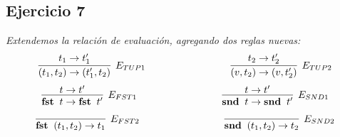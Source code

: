 \documentclass[a4paper,10pt]{article}
\begin{document}
\pagebreak
\subsection*{Ejercicio 7} 
	\emph{Extendemos la relación de evaluación, agregando dos reglas nuevas:}
	\\
	\begin{align*}
		\infer[E_{TUP1}]{
			(t_{1},t_{2}) \rightarrow (t_{1}',t_{2})
		}{
			t_{1} \rightarrow t_{1}'
		} \hspace{3cm}
		\infer[E_{TUP2}]{
			(v,t_{2}) \rightarrow (v,t_{2}')
		}{
			t_{2} \rightarrow t_{2}'
		}
	\end{align*}
	\begin{align*}
		\infer[E_{FST1}]{
			{\bf fst}\;\;t \rightarrow {\bf fst}\;\;t'
		}{
			t \rightarrow t'
		} \hspace{3cm}
		\infer[E_{SND1}]{
			{\bf snd}\;\;t \rightarrow {\bf snd}\;\;t'
		}{
			t \rightarrow t'
		}
	\end{align*}
	\begin{align*}
		\infer[E_{FST2}]{
			{\bf fst}\;\;(t_{1},t_{2}) \rightarrow t_{1}
		}{
		} \hspace{3cm}
		\infer[E_{SND2}]{
			{\bf snd}\;\;(t_{1},t_{2}) \rightarrow t_{2}
		}{
		}
	\end{align*}
	\\
	\\
	\\	
\end{document}
